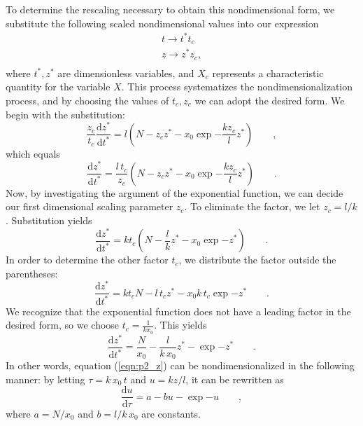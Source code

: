 \documentclass[draft]{agujournal2019}
\begin{document}
To determine the rescaling necessary to obtain this nondimensional form, we substitute the following scaled nondimensional values into our expression 
\begin{align*}
    t\longrightarrow t^* t_c\\
    z\longrightarrow z^* z_c,\\
\end{align*}
where $t^*,z^*$ are dimensionless variables, and $X_c$ represents a characteristic quantity for the variable $X$. This process systematizes the nondimensionalization process, and by choosing the values of $t_c,z_c$ we can adopt the desired form. We begin with the substitution:
\begin{equation*}
    \frac{z_c}{t_c} \frac{\mathrm{d}z^*}{\mathrm{d}t^*} = l \left( N - z_c z^* - x_0\exp{-\frac{kz_c }{l}z^*}  \right) \qquad , 
\end{equation*}
which equals
\begin{equation*}
    \frac{\mathrm{d}z^*}{\mathrm{d}t^*} = \frac{l \,t_c}{z_c} \left( N - z_c z^* - x_0\exp{-\frac{kz_c }{l}z^*}  \right) \qquad .  
\end{equation*}
Now, by investigating the argument of the exponential function, we can decide our first dimensional scaling parameter $z_c$. To eliminate the factor, we let $z_c=l/k$. Substitution yields
\begin{equation*}
    \frac{\mathrm{d}z^*}{\mathrm{d}t^*} = k t_c \left( N - \frac{l}{k} z^* - x_0\exp{-z^*}  \right) \qquad .  
\end{equation*}
In order to determine the other factor $t_c$, we distribute the factor outside the parentheses:
\begin{equation*}
    \frac{\mathrm{d}z^*}{\mathrm{d}t^*} = k t_c N - l\,t_c z^* - x_0 k\, t_c\exp{-z^*} \qquad .  
\end{equation*}
We recognize that the exponential function does not have a leading factor in the desired form, so we choose $t_c = \frac{1}{kx_0}$. This yields
\begin{equation*}
    \frac{\mathrm{d}z^*}{\mathrm{d}t^*} = \frac{N}{x_0} - \frac{l}{k\,x_0} z^* - \exp{-z^*} \qquad .  
\end{equation*}
In other words, equation (\ref{eqn:p2_z}) can be nondimensionalized in the following manner: by letting $\tau = k \,x_0\,t$ and $u = kz / l$, it can be rewritten as 
\begin{equation*}
    \frac{\mathrm{d}u}{\mathrm{d}\tau} = a - b u - \exp{-u} \qquad ,
\end{equation*}
where $a= N/x_0$ and $b=l/k\,x_0$ are constants. 
\end{document}
